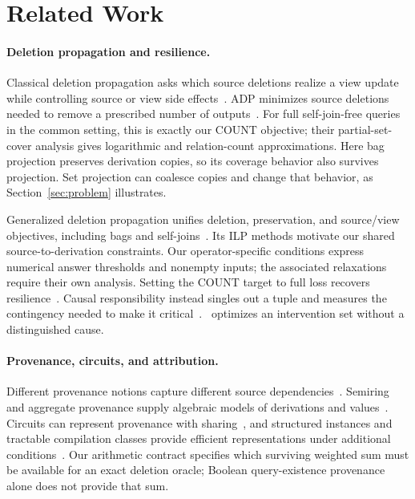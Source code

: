 \section{Related Work}
\label{sec:related}

\paragraph{Deletion propagation and resilience.}
Classical deletion propagation asks which source deletions realize a view
update while controlling source or view side
effects~\cite{buneman2002deletion,kimelfeld2011deletion}. ADP minimizes
source deletions needed to remove a prescribed number of
outputs~\cite{hu2021adp}. For full self-join-free queries in the common
setting, this is exactly our COUNT objective; their partial-set-cover
analysis gives logarithmic and relation-count approximations. Here bag
projection preserves derivation copies, so its coverage behavior also
survives projection. Set projection can coalesce copies and change that
behavior, as Section~\ref{sec:problem} illustrates.

Generalized deletion propagation unifies deletion, preservation, and
source/view objectives, including bags and
self-joins~\cite{makhija2025ilp}. Its ILP methods motivate our shared
source-to-derivation constraints. Our operator-specific conditions express
numerical answer thresholds and nonempty inputs; the associated
relaxations require their own analysis. Setting the COUNT target to full
loss recovers resilience~\cite{freire2015resilience}. Causal responsibility
instead singles out a tuple and measures the contingency needed to make
it critical~\cite{meliou2010causality}. \MIW\ optimizes an intervention
set without a distinguished cause.

\paragraph{Provenance, circuits, and attribution.}
Different provenance notions capture different source
dependencies~\cite{buneman2001whywhere,cheney2009provenance}. Semiring and
aggregate provenance supply algebraic models of derivations and
values~\cite{green2007provenance,amsterdamer2011aggregate}. Circuits can
represent provenance with sharing~\cite{deutch2014circuits}, and structured
instances and tractable compilation classes provide efficient
representations under additional
conditions~\cite{amarilli2015circuits,amarilli2024tractable}. Our arithmetic
contract specifies which surviving weighted sum must be available for an
exact deletion oracle; Boolean query-existence provenance alone does not
provide that sum.

